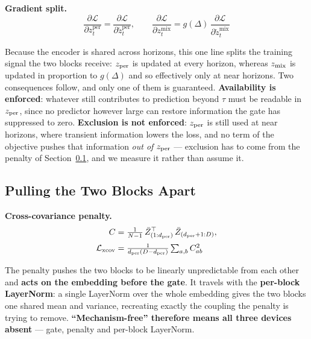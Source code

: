 \textbf{Gradient split.}
\begin{equation}
\frac{\partial\mathcal{L}}{\partial z_t^{\mathrm{per}}} = \frac{\partial\mathcal{L}}{\partial \tilde z_t^{\mathrm{per}}}, \qquad \frac{\partial\mathcal{L}}{\partial z_t^{\mathrm{mix}}} = g(\Delta)\,\frac{\partial\mathcal{L}}{\partial \tilde z_t^{\mathrm{mix}}}
\label{eq:grad}
\end{equation}

Because the encoder is shared across horizons, this one line splits the training signal the two blocks receive: $z_{\mathrm{per}}$ is updated at every horizon, whereas $z_{\mathrm{mix}}$ is updated in proportion to $g(\Delta)$ and so effectively only at near horizons. Two consequences follow, and only one of them is guaranteed. \textbf{Availability is enforced}: whatever still contributes to prediction beyond $\tau$ must be readable in $z_{\mathrm{per}}$, since no predictor however large can restore information the gate has suppressed to zero. \textbf{Exclusion is not enforced}: $z_{\mathrm{per}}$ is still used at near horizons, where transient information lowers the loss, and no term of the objective pushes that information \emph{out of} $z_{\mathrm{per}}$ --- exclusion has to come from the penalty of Section~\ref{sec:xcov}, and we measure it rather than assume it.

\subsection{Pulling the Two Blocks Apart}
\label{sec:xcov}

\textbf{Cross-covariance penalty.}
\begin{equation}
\begin{split}
C &= \tfrac{1}{N-1}\,\bar Z^{\top}_{(1:d_{\mathrm{per}})}\,\bar Z_{(d_{\mathrm{per}}+1:D)},\\[2pt]
\mathcal{L}_{\text{xcov}} &= \tfrac{1}{d_{\mathrm{per}} (D-d_{\mathrm{per}})}\textstyle\sum_{a,b} C_{ab}^{2}
\end{split}
\label{eq:xcov}
\end{equation}

The penalty pushes the two blocks to be linearly unpredictable from each other and \textbf{acts on the embedding before the gate}. It travels with the \textbf{per-block LayerNorm}: a single LayerNorm over the whole embedding gives the two blocks one shared mean and variance, recreating exactly the coupling the penalty is trying to remove. \textbf{``Mechanism-free'' therefore means all three devices absent} --- gate, penalty and per-block LayerNorm.

